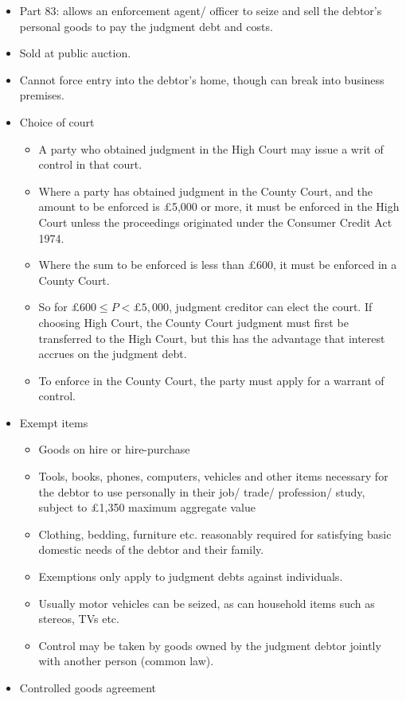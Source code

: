 \documentclass[
]{article}
\providecommand{\tightlist}{%
  \setlength{\itemsep}{0pt}\setlength{\parskip}{0pt}}
\begin{document}
\begin{itemize}
\tightlist
\item
  Part 83: allows an enforcement agent/ officer to seize and sell the
  debtor's personal goods to pay the judgment debt and costs.
\item
  Sold at public auction.
\item
  Cannot force entry into the debtor's home, though can break into
  business premises.
\item
  Choice of court

  \begin{itemize}
  \tightlist
  \item
    A party who obtained judgment in the High Court may issue a writ of
    control in that court.
  \item
    Where a party has obtained judgment in the County Court, and the
    amount to be enforced is £5,000 or more, it must be enforced in the
    High Court unless the proceedings originated under the Consumer
    Credit Act 1974.
  \item
    Where the sum to be enforced is less than £600, it must be enforced
    in a County Court.
  \item
    So for \(£600 \leq P < £5,000\), judgment creditor can elect the
    court. If choosing High Court, the County Court judgment must first
    be transferred to the High Court, but this has the advantage that
    interest accrues on the judgment debt.
  \item
    To enforce in the County Court, the party must apply for a warrant
    of control.
  \end{itemize}
\item
  Exempt items

  \begin{itemize}
  \tightlist
  \item
    Goods on hire or hire-purchase
  \item
    Tools, books, phones, computers, vehicles and other items necessary
    for the debtor to use personally in their job/ trade/ profession/
    study, subject to £1,350 maximum aggregate value
  \item
    Clothing, bedding, furniture etc. reasonably required for satisfying
    basic domestic needs of the debtor and their family.
  \item
    Exemptions only apply to judgment debts against individuals.
  \item
    Usually motor vehicles can be seized, as can household items such as
    stereos, TVs etc.
  \item
    Control may be taken by goods owned by the judgment debtor jointly
    with another person (common law).
  \end{itemize}
\item
  Controlled goods agreement


\end{itemize}
\end{document}
